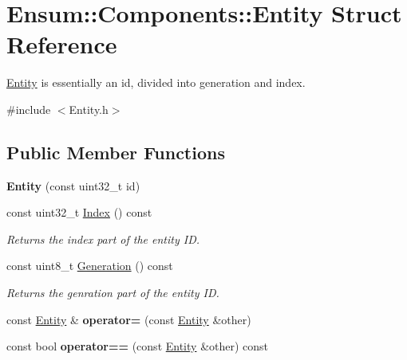 \hypertarget{struct_ensum_1_1_components_1_1_entity}{}\section{Ensum\+:\+:Components\+:\+:Entity Struct Reference}
\label{struct_ensum_1_1_components_1_1_entity}


\hyperlink{struct_ensum_1_1_components_1_1_entity}{Entity} is essentially an id, divided into generation and index.  




{\ttfamily \#include $<$Entity.\+h$>$}

\subsection*{Public Member Functions}
\begin{DoxyCompactItemize}
\item 
{\bfseries Entity} (const uint32\+\_\+t id)\hypertarget{struct_ensum_1_1_components_1_1_entity_a4eacdb9354583a1b2a946c4b18ec32af}{}\label{struct_ensum_1_1_components_1_1_entity_a4eacdb9354583a1b2a946c4b18ec32af}

\item 
const uint32\+\_\+t \hyperlink{struct_ensum_1_1_components_1_1_entity_a166ed226733f98a44407dea8d00d3293}{Index} () const \hypertarget{struct_ensum_1_1_components_1_1_entity_a166ed226733f98a44407dea8d00d3293}{}\label{struct_ensum_1_1_components_1_1_entity_a166ed226733f98a44407dea8d00d3293}

\begin{DoxyCompactList}\small\item\em Returns the index part of the entity ID. \end{DoxyCompactList}\item 
const uint8\+\_\+t \hyperlink{struct_ensum_1_1_components_1_1_entity_addbbcdac8d8fc445292ec8da5f72715e}{Generation} () const \hypertarget{struct_ensum_1_1_components_1_1_entity_addbbcdac8d8fc445292ec8da5f72715e}{}\label{struct_ensum_1_1_components_1_1_entity_addbbcdac8d8fc445292ec8da5f72715e}

\begin{DoxyCompactList}\small\item\em Returns the genration part of the entity ID. \end{DoxyCompactList}\item 
const \hyperlink{struct_ensum_1_1_components_1_1_entity}{Entity} \& {\bfseries operator=} (const \hyperlink{struct_ensum_1_1_components_1_1_entity}{Entity} \&other)\hypertarget{struct_ensum_1_1_components_1_1_entity_a671dfaa0d8f92f61b3203104770cbc5e}{}\label{struct_ensum_1_1_components_1_1_entity_a671dfaa0d8f92f61b3203104770cbc5e}

\item 
const bool {\bfseries operator==} (const \hyperlink{struct_ensum_1_1_components_1_1_entity}{Entity} \&other) const \hypertarget{struct_ensum_1_1_components_1_1_entity_af839a9836c7ae43b1a1d5216119cea2d}{}\label{struct_ensum_1_1_components_1_1_entity_af839a9836c7ae43b1a1d5216119cea2d}

\end{DoxyCompactItemize}
